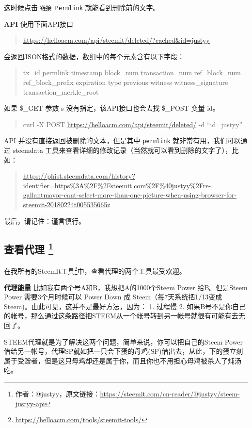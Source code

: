 \documentclass[]{ctexbook}
\renewcommand{\href}[2]{#2\footnote{\url{#1}}}
\begin{document}
这时候点击 \texttt{链接\ Permlink} 就能看到删除前的文字。

\textbf{API}
使用下面API接口

\begin{quote}
\url{https://helloacm.com/api/steemit/deleted/?cached\&id=justyy}
\end{quote}

会返回JSON格式的数据，数组中的每个元素含有以下字段：

\begin{quote}
tx\_id
permlink
timestamp
block\_num
transaction\_num
ref\_block\_num
ref\_block\_prefix
expiration
type
previous
witness
witness\_signature
transaction\_merkle\_root
\end{quote}

如果 \$\_GET 参数 s 没有指定，该API接口也会去找 \$\_POST 变量 id。

\begin{quote}
curl -X POST \url{https://helloacm.com/api/steemit/deleted/} -d ``id=justyy''
\end{quote}

API 并没有直接返回被删除的文本，但是其中 \texttt{permlink} 就非常有用，我们可以通过 steemdata 工具来查看详细的修改记录（当然就可以看到删除的文字了），比如：

\begin{quote}
\url{https://phist.steemdata.com/history?identifier=https\%3A\%2F\%2Fsteemit.com\%2F\%40justyy\%2Fre-gallantmayor-cant-select-more-than-one-picture-when-using-browser-for-steemit-20180224t005535665z}
\end{quote}

最后，请记住：谨言慎行。

\subsection[查看代理 ]{\texorpdfstring{查看代理 \footnote{作者：@justyy，原文链接：\url{https://steemit.com/cn-reader/@justyy/steem-justyy-api}}}{查看代理 }}

在我所有的\href{https://helloacm.com/tools/steemit-tools/}{SteemIt工具}中，查看代理的两个工具最受欢迎。

\textbf{代理能量}
比如我有两个号A和B，我想把A的1000个Steem Power 给B。但是Steem Power 需要3个月时候可以 Power Down 成 Steem（每7天系统把1/13变成Steem)。由此可见，这并不是最好方法，因为：
1. 过程慢
2. 如果B号不是你自己的帐号，那么通过这条路径把STEEM从一个帐号转到另一帐号就很有可能有去无回了。

STEEM代理就是为了解决这两个问题，简单来说，你可以把自己的Steem Power借给另一帐号，代理SP就如把一只会下蛋的母鸡(SP)借出去，从此，下的蛋立刻属于受赠者，但是这只母鸡却还是属于你，而且你也不用担心母鸡被杀人了炖汤吃。
\end{document}

